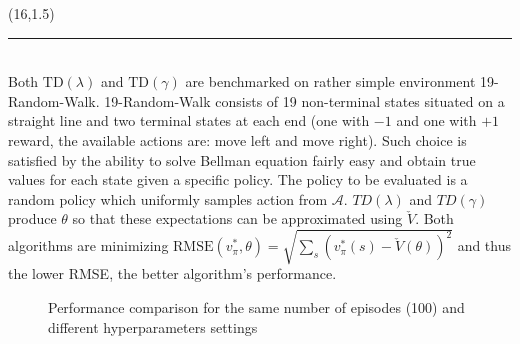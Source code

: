 \documentclass[a0]{a0poster}
\def\Head#1{\noindent{\LARGE\color{bluegray} #1}\bigskip}
\begin{document}
\begin{textblock}{7.0}(16,1.5)

\medskip
\hrule\medskip
\Head{Experiment}\\

Both $\text{TD}(\lambda)$ and $\text{TD}(\gamma)$ are benchmarked on rather
simple environment 19-Random-Walk. 19-Random-Walk consists of 19 non-terminal
states situated on a straight line and two terminal states at each end (one
with $-1$ and one with $+1$ reward, the available actions are: move left and
move right). Such choice is satisfied by the ability to solve Bellman equation
fairly easy and obtain true values for each state given a specific policy. The
policy to be evaluated is a random policy which uniformly samples action from
$\mathcal{A}$. $TD(\lambda)$ and $TD(\gamma)$ produce $\theta$ so that these
expectations can be approximated using $\check{V}$. Both algorithms are
minimizing $\text{RMSE}(v_\pi^*, \theta) = \sqrt{\sum_{s} {(v_\pi^*(s) -
\check{V}(\theta))}^2}$ and thus the lower RMSE, the better algorithm's
performance.

\begin{center}
\begin{figure}%
    \centering
    \qquad
    \caption{Performance comparison for the same number of episodes (100) and
             different hyperparameters settings}%
    \label{fig:results}%
\end{figure}
\end{center}


\end{textblock}
\end{document}
